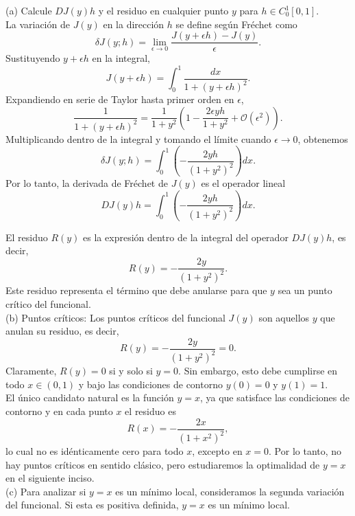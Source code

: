 \documentclass{elsarticle}
\begin{document}
(a) Calcule \( DJ(y)h \) y el residuo en cualquier punto \( y \) para \( h \in C_0^1[0,1] \).  \\

La variación de \( J(y) \) en la dirección \( h \) se define según Fréchet como  
\[
\delta J(y; h) = \lim_{\epsilon \to 0} \frac{J(y + \epsilon h) - J(y)}{\epsilon}.
\]  
Sustituyendo \( y + \epsilon h \) en la integral,  
\[
J(y + \epsilon h) = \int_0^1 \frac{dx}{1 + (y + \epsilon h)^2}.
\]  
Expandiendo en serie de Taylor hasta primer orden en \( \epsilon \),  
\[
\frac{1}{1 + (y + \epsilon h)^2} = \frac{1}{1 + y^2} \left( 1 - \frac{2\epsilon y h}{1 + y^2} + \mathcal{O}(\epsilon^2) \right).
\]  
Multiplicando dentro de la integral y tomando el límite cuando \( \epsilon \to 0 \), obtenemos  
\[
\delta J(y; h) = \int_0^1 \left(-\frac{2y h}{(1 + y^2)^2} \right) dx.
\]  
Por lo tanto, la derivada de Fréchet de \( J(y) \) es el operador lineal  
\[
DJ(y)h = \int_0^1 \left(-\frac{2y h}{(1 + y^2)^2} \right) dx.
\]  

El residuo \( R(y) \) es la expresión dentro de la integral del operador \( DJ(y)h \), es decir,  
\[
R(y) = -\frac{2y}{(1 + y^2)^2}.
\]  
Este residuo representa el término que debe anularse para que \( y \) sea un punto crítico del funcional.  \\

(b) Puntos críticos: Los puntos críticos del funcional \( J(y) \) son aquellos \( y \) que anulan su residuo, es decir,  
\[
R(y) = -\frac{2y}{(1 + y^2)^2} = 0.
\]  
Claramente, \( R(y) = 0 \) si y solo si \( y = 0 \). Sin embargo, esto debe cumplirse en todo \( x \in (0,1) \) y bajo las condiciones de contorno \( y(0) = 0 \) y \( y(1) = 1 \).  \\

El único candidato natural es la función \( y = x \), ya que satisface las condiciones de contorno y en cada punto \( x \) el residuo es
\[
R(x) = -\frac{2x}{(1 + x^2)^2},
\]  
lo cual no es idénticamente cero para todo \( x \), excepto en \( x = 0 \). Por lo tanto, no hay puntos críticos en sentido clásico, pero estudiaremos la optimalidad de \( y = x \) en el siguiente inciso.  \\

(c) Para analizar si \( y = x \) es un mínimo local, consideramos la segunda variación del funcional. Si esta es positiva definida, \( y = x \) es un mínimo local.  \\
\end{document}
